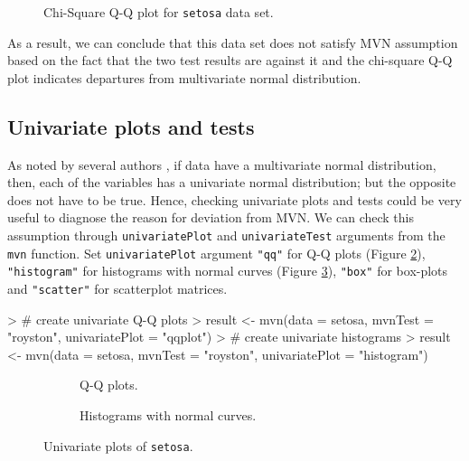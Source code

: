 \documentclass[11pt]{article}
\begin{document}
\begin{figure}[htb]
  \centering
  \scalebox{0.5}{
  }
  \caption{Chi-Square Q-Q plot for \texttt{setosa} data set.} \label{qq:iris4}
\end{figure}

As a result, we can conclude that this data set does not satisfy MVN assumption based on the fact that the two test results are against it and the chi-square Q-Q plot indicates departures from multivariate normal distribution.

\subsection{Univariate plots and tests}

As noted by several authors \cite{burdenski2000, stevens2012applied, kass2014}, if data have a multivariate normal distribution, then, each of the variables has a univariate normal distribution; but the opposite does not have to be true. Hence, checking univariate plots and tests could be very useful to diagnose the reason for deviation from MVN. We can check this assumption through \texttt{univariatePlot} and \texttt{univariateTest} arguments from the \texttt{mvn} function. Set \texttt{univariatePlot} argument  \texttt{"qq"} for Q-Q plots (Figure \ref{subfig:UniQQ}), \texttt{"histogram"} for histograms with normal curves (Figure \ref{subfig:UniHist}), \texttt{"box"} for box-plots and \texttt{"scatter"} for scatterplot matrices.


\begin{Schunk}
\begin{Sinput}
> # create univariate Q-Q plots
> result <- mvn(data = setosa, mvnTest = "royston", univariatePlot = "qqplot")
> # create univariate histograms
> result <- mvn(data = setosa, mvnTest = "royston", univariatePlot = "histogram")
\end{Sinput}
\end{Schunk}

\begin{figure}[htb]
\centering
	\begin{subfigure}[b]{0.485\textwidth}
\centering
\scalebox{0.90}{
}
		\caption{Q-Q plots.}
		\label{subfig:UniQQ}
	\end{subfigure}%
	\quad 	%
	\begin{subfigure}[b]{0.485\textwidth}
\centering
\scalebox{0.90}{
}
		\caption{Histograms with normal curves.}
		\label{subfig:UniHist}
	\end{subfigure}
\caption{Univariate plots of \texttt{setosa}.} \label{fig:uniQQHist}
\end{figure}
\end{document}
